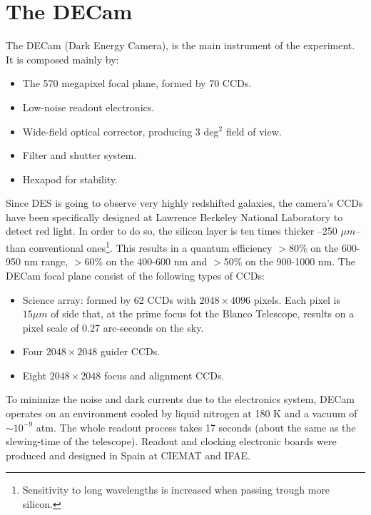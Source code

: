 \section{The DECam}
The DECam (Dark Energy Camera), is the main instrument of the experiment. It is composed mainly by:
\begin{itemize}
	\item The 570 megapixel focal plane, formed by 70 CCDs.
    \item Low-noise readout electronics.
    \item Wide-field optical corrector, producing 3 deg$^2$ field of view.
    \item Filter and shutter system.
    \item Hexapod for stability.   
\end{itemize}
Since DES is going to observe very highly redshifted galaxies, the camera's CCDs have been specifically designed at Lawrence Berkeley National Laboratory to detect red light. In order to do so, the silicon layer is ten times thicker --250 $\mu m$-- than conventional ones\footnote{Sensitivity to long wavelengths is increased when passing trough more silicon.}. This results in a quantum efficiency $>$80\% on the 600-950 nm range, $>$60\% on the 400-600 nm and $>$50\% on the 900-1000 nm. The DECam focal plane consist of the following types of CCDs:
\begin{itemize}
\item Science array: formed by 62 CCDs with $2048\times 4096$ pixels. Each pixel is $15\mu m$ of side that, at the prime focus fot the  Blanco Telescope, results on a pixel scale of 0.27 arc-seconds on the sky.
\item Four $2048\times2048$ guider CCDs.
\item Eight $2048\times 2048$ focus and alignment CCDs.
\end{itemize}
To minimize the noise and dark currents due to the electronics system, DECam operates on an environment cooled by liquid nitrogen at 180 K and a vacuum of $\sim 10^{-9}$ atm. The whole readout process takes 17 seconds (about the same as the slewing-time of the telescope). Readout and clocking electronic boards were produced and designed in Spain at CIEMAT and IFAE.
